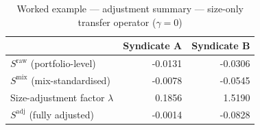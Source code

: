 \begin{table}[htbp]
\centering
\caption{Worked example --- adjustment summary --- size-only transfer operator ($\gamma=0$)}
\label{tab:worked_example_summary}
\begin{tabular}{lrr}
\toprule
 & \textbf{Syndicate A} & \textbf{Syndicate B} \\
\midrule
$S^{\mathrm{raw}}$ (portfolio-level) & -0.0131 & -0.0306 \\
$S^{\mathrm{mix}}$ (mix-standardised) & -0.0078 & -0.0545 \\
Size-adjustment factor $\lambda$ & 0.1856 & 1.5190 \\
$S^{\mathrm{adj}}$ (fully adjusted) & -0.0014 & -0.0828 \\
\bottomrule
\end{tabular}
\end{table}

